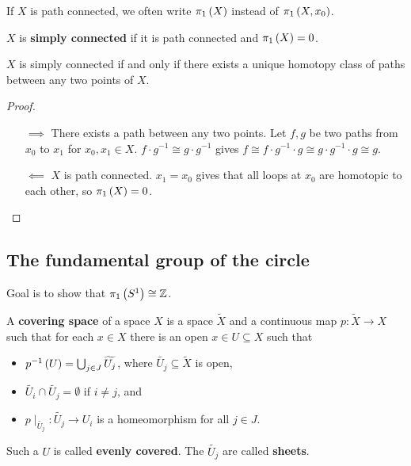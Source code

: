 If $ X $ is path connected, we often write $ \pi_1\left( X \right) $ instead of $ \pi_1\left( X, x_0 \right) $.

\begin{definition*}
$ X $ is \textbf{simply connected} if it is path connected and $ \pi_1\left( X \right) = 0 $.
\end{definition*}

\begin{proposition}
$ X $ is simply connected if and only if there exists a unique homotopy class of paths between any two points of $ X $.
\end{proposition}

\begin{proof}
\hfill
\begin{itemize}
\item[$ \implies $] There exists a path between any two points. Let $ f, g $ be two paths from $ x_0 $ to $ x_1 $ for $ x_0, x_1 \in X $. $ f \cdot g^{-1} \cong g \cdot g^{-1} $ gives $ f \cong f \cdot g^{-1} \cdot g \cong g \cdot g^{-1} \cdot g \cong g $.
\item[$ \impliedby $] $ X $ is path connected. $ x_1 = x_0 $ gives that all loops at $ x_0 $ are homotopic to each other, so $ \pi_1\left( X \right) = 0 $.
\end{itemize}
\end{proof}

\subsection{The fundamental group of the circle}

Goal is to show that $ \pi_1\left( S^1 \right) \cong \mathbb{Z} $.


\begin{definition*}
A \textbf{covering space} of a space $ X $ is a space $ \widetilde{X} $ and a continuous map $ p : \widetilde{X} \to X $ such that for each $ x \in X $ there is an open $ x \in U \subseteq X $ such that
\begin{itemize}
\item $ p^{-1}\left( U \right) = \bigcup_{j \in J} \widetilde{U_j} $, where $ \widetilde{U_j} \subseteq \widetilde{X} $ is open,
\item $ \widetilde{U_i} \cap \widetilde{U_j} = \emptyset $ if $ i \ne j $, and
\item $ p \mid_{\widetilde{U_j}} : \widetilde{U_j} \to U_i $ is a homeomorphism for all $ j \in J $.
\end{itemize}
Such a $ U $ is called \textbf{evenly covered}. The $ \widetilde{U_j} $ are called \textbf{sheets}.
\end{definition*}

